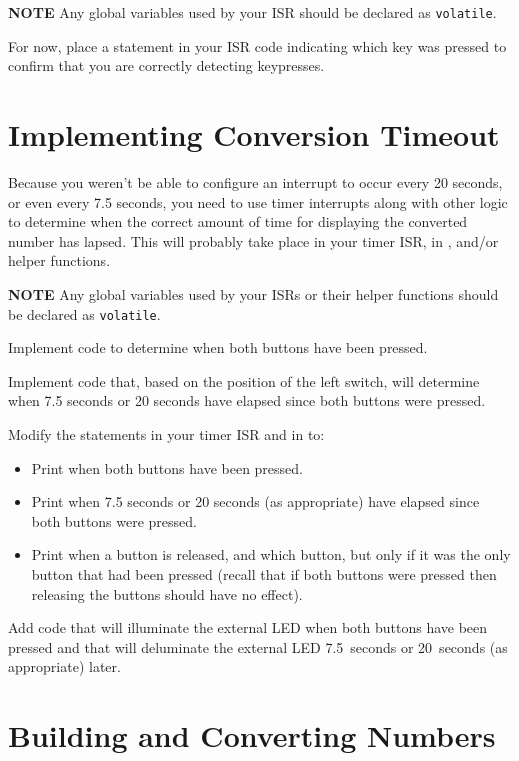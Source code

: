 \textbf{NOTE} Any global variables used by your ISR should be declared as
\lstinline{volatile}.

For now, place a  statement in your ISR code indicating which
key was pressed to confirm that you are correctly detecting keypresses.

\section{Implementing Conversion Timeout}\label{sec:ConversionTimeout}

Because you weren't be able to configure an interrupt to occur every 20 seconds,
or even every 7.5 seconds, you need to use timer interrupts along with other
logic to determine when the correct amount of time for displaying the converted
number has lapsed. This will probably take place in your timer ISR, in
, and/or helper functions.

\textbf{NOTE} Any global variables used by your ISRs or their helper functions
should be declared as \lstinline{volatile}.

Implement code to determine when both buttons have been pressed.

Implement code that, based on the position of the left switch, will determine
when 7.5 seconds or 20 seconds have elapsed since both buttons were pressed.

Modify the  statements in your timer ISR and in
 to:
\begin{itemize}
\item Print when both buttons have been pressed.
\item Print when 7.5 seconds or 20 seconds (as appropriate) have elapsed since
    both buttons were pressed.
\item Print when a button is released, and which button, but only if it was the
    only button that had been pressed (recall that if both buttons were pressed
    then releasing the buttons should have no effect).
\end{itemize}

Add code that will illuminate the external LED when both buttons have been pressed
and that will deluminate the external LED 7.5~seconds or 20~seconds (as
appropriate) later.

\section{Building and Converting Numbers}\label{sec:BuildingAndConverting}

